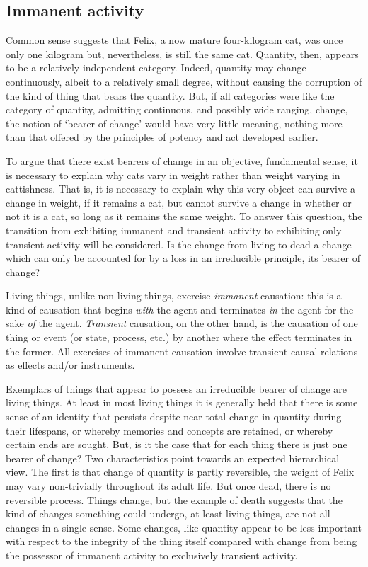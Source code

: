 \subsection{Immanent activity}

Common sense suggests that Felix, a now mature four-kilogram cat, was once only one kilogram but, nevertheless, is still the same cat. Quantity, then, appears to be a relatively independent category. Indeed, quantity may change continuously, albeit to a relatively small degree, without causing the corruption of the kind of thing that bears the quantity. But, if all categories were like the category of quantity, admitting continuous, and possibly wide ranging, change, the notion of `bearer of change' would have very little meaning, nothing more than that offered by the principles of potency and act developed earlier.

To argue that there exist bearers of change in an objective, fundamental sense, it is necessary to explain why cats vary in weight rather than weight varying in cattishness.
That is, it is necessary to explain why this very object can survive a change in weight, if it remains a cat, but cannot survive a change in whether or not it is a cat, so long as it remains the same weight.
To answer this question, the transition from exhibiting immanent and transient activity to exhibiting only transient activity will be considered. Is the change from living to dead a change which can only be accounted for by a loss in an irreducible principle, its bearer of change?
\begin{quoting}
Living things, unlike non-living things, exercise \emph{immanent} causation: this is a kind of causation that begins \emph{with} the agent and terminates \emph{in} the agent for the sake \emph{of} the agent. \emph{Transient} causation, on the other hand, is the causation of one thing or event (or state, process, etc.) by another where the effect terminates in the former. All exercises of immanent causation involve transient causal relations as effects and/or instruments. \parencite[][180]{Oderberg2007-ODERE-2}
\end{quoting}

Exemplars of things that appear to possess an irreducible bearer of change are living things. At least in most living things it is generally held that there is some sense of an identity that persists despite near total change in quantity during their lifespans, or whereby memories and concepts are retained, or whereby certain ends are sought. But, is it the case that for each thing there is just one bearer of change? Two characteristics point towards an expected hierarchical view. The first is that change of quantity is partly reversible, the weight of Felix may vary non-trivially throughout its adult life. But once dead, there is no reversible process. Things change, but the example of death suggests that the kind of changes something could undergo, at least living things, are not all changes in a single sense. Some changes, like quantity appear to be less important with respect to the integrity of the thing itself compared with change from being the possessor of immanent activity to exclusively transient activity.

